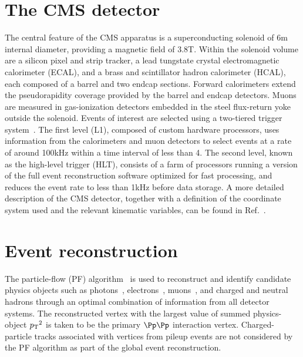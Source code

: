 
\section{The CMS detector}
\label{sec:detector}

The central feature of the CMS apparatus is a superconducting solenoid
of 6\unit{m} internal diameter, providing a magnetic field of
3.8\unit{T}. Within the solenoid volume are a silicon pixel and strip
tracker, a lead tungstate crystal electromagnetic calorimeter (ECAL),
and a brass and scintillator hadron calorimeter (HCAL), each composed
of a barrel and two endcap sections. Forward calorimeters extend the
pseudorapidity coverage provided by the barrel and endcap
detectors. Muons are measured in gas-ionization detectors embedded in
the steel flux-return yoke outside the solenoid. Events of interest
are selected using a two-tiered trigger
system~\cite{Khachatryan:2016bia}. The first level (L1), composed of
custom hardware processors, uses information from the calorimeters and
muon detectors to select events at a rate of around 100\unit{kHz}
within a time interval of less than 4\mus. The second level, known as
the high-level trigger (HLT), consists of a farm of processors running
a version of the full event reconstruction software optimized for fast
processing, and reduces the event rate to less than 1\unit{kHz} before
data storage.  A more detailed description of the CMS detector,
together with a definition of the coordinate system used and the
relevant kinematic variables, can be found in
Ref.~\cite{Chatrchyan:2008zzk}.


\section{Event reconstruction}
\label{sec:reconstruction}

The particle-flow (PF) algorithm~\cite{CMS-PAS-PFT-09-001,
  CMS-PAS-PFT-10-001} is used to reconstruct and identify candidate
physics objects such as photons~\cite{CMS:EGM-14-001},
electrons~\cite{Khachatryan:2015hwa}, muons~\cite{Chatrchyan:2012xi},
and charged and neutral hadrons through an optimal combination of
information from all detector systems. The reconstructed vertex with
the largest value of summed physics-object ${p_{\text T}}^2$ is taken to be the
primary $\Pp\Pp$ interaction vertex. Charged-particle tracks
associated with vertices from pileup events are not considered by the
PF algorithm as part of the global event reconstruction.

